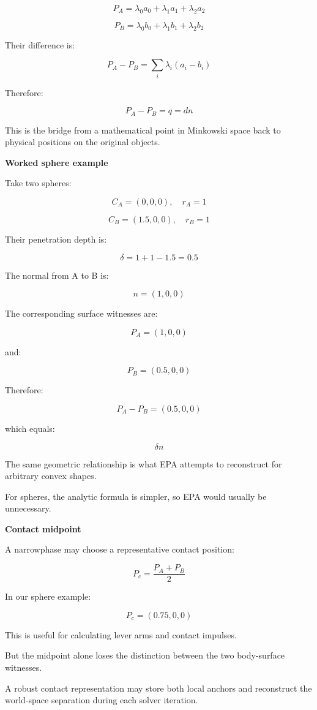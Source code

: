 \[
\boxed{ P_A=\lambda_0a_0+\lambda_1a_1+\lambda_2a_2 }
\]

\[
\boxed{ P_B=\lambda_0b_0+\lambda_1b_1+\lambda_2b_2 }
\]

Their difference is:

\[
P_A-P_B = \sum_i\lambda_i(a_i-b_i)
\]

Therefore:

\[
\boxed{ P_A-P_B=q=dn }
\]

This is the bridge from a mathematical point in Minkowski space back to physical positions on the original objects.

\textbf{Worked sphere example}

Take two spheres:

\[
C_A=(0,0,0),\quad r_A=1
\]

\[
C_B=(1.5,0,0),\quad r_B=1
\]

Their penetration depth is:

\[
\delta=1+1-1.5=0.5
\]

The normal from A to B is:

\[
n=(1,0,0)
\]

The corresponding surface witnesses are:

\[
P_A=(1,0,0)
\]

and:

\[
P_B=(0.5,0,0)
\]

Therefore:

\[
P_A-P_B=(0.5,0,0)
\]

which equals:

\[
\delta n
\]

The same geometric relationship is what EPA attempts to reconstruct for arbitrary convex shapes.

For spheres, the analytic formula is simpler, so EPA would usually be unnecessary.

\textbf{Contact midpoint}

A narrowphase may choose a representative contact position:

\[
\boxed{ P_c=\frac{P_A+P_B}{2} }
\]

In our sphere example:

\[
P_c=(0.75,0,0)
\]

This is useful for calculating lever arms and contact impulses.

But the midpoint alone loses the distinction between the two body-surface witnesses.

A robust contact representation may store both local anchors and reconstruct the world-space separation during each solver iteration.


